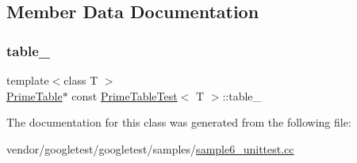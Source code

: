 \subsection{Member Data Documentation}
\mbox{\label{class_prime_table_test_a86da90fc6d5cef6386d0cd8fb52b4046}} 
\subsubsection{\texorpdfstring{table\+\_\+}{table\_}}
{\footnotesize\ttfamily template$<$class T $>$ \\
\hyperlink{class_prime_table}{Prime\+Table}$\ast$ const \hyperlink{class_prime_table_test}{Prime\+Table\+Test}$<$ T $>$\+::table\+\_\+\hspace{0.3cm}{\ttfamily [protected]}}



The documentation for this class was generated from the following file\+:\begin{DoxyCompactItemize}
\item 
vendor/googletest/googletest/samples/\hyperlink{sample6__unittest_8cc}{sample6\+\_\+unittest.\+cc}\end{DoxyCompactItemize}
